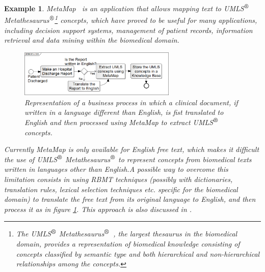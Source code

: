 \documentclass[11pt]{article}
\newtheorem{ex}[theo]{Example}
\begin{document}
\begin{ex}
MetaMap~\citep{metamap} is an application that allows mapping text to UMLS$^{\mbox{\small\textregistered}}$ Metathesaurus$^{\mbox{\small\textregistered}}$\footnote{The UMLS$^{\mbox{\small\textregistered}}$ Metathesaurus$^{\mbox{\small\textregistered}}$~\citep{umls}, the largest thesaurus in the biomedical domain, provides a representation of biomedical knowledge consisting of concepts classified by semantic type and both hierarchical and non-hierarchical relationships among the concepts.} concepts, which have proved to be useful for many applications, including decision support systems, management of patient records, information retrieval and data mining within the biomedical domain.

\begin{figure}[!ht]
\begin{center}
\includegraphics[width=7.5cm]{mtsoa}
\end{center}
\caption{Representation of a business process in which a clinical document, if written in a language different than English, is fist translated to English and then processed using MetaMap to extract UMLS$^{\mbox{\small\textregistered}}$ concepts.}
\label{fig:mtsoa}
\end{figure}

Currently MetaMap is only available for English free text, which makes it difficult the use of UMLS$^{\mbox{\small\textregistered}}$ Metathesaurus$^{\mbox{\small\textregistered}}$ to represent concepts from biomedical texts written in languages other than English.A possible way to overcome this limitation consists in using RBMT techniques (possibly with dictionaries, translation rules, lexical selection techniques etc. specific for the biomedical domain) to translate the free text from its original language to English, and then process it as in figure \ref{fig:mtsoa}. This approach is also discussed in .
\end{ex}
\end{document}
